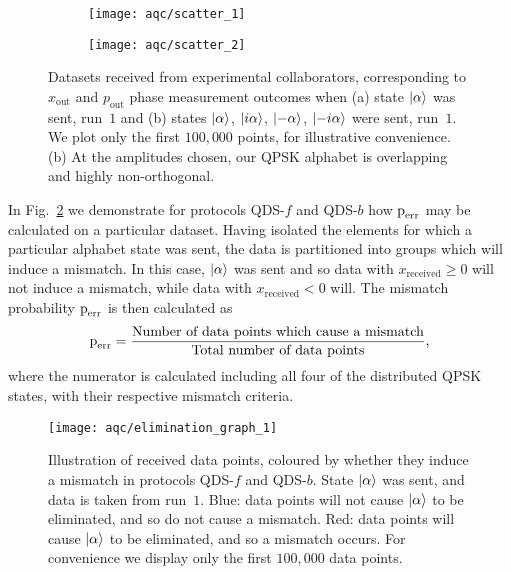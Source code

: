 \begin{figure}[htp]
\captionsetup{width=0.8\linewidth}
\centering
	\begin{subfigure}{0.49\linewidth}
	\centering
	\texttt{[image: aqc/scatter\_1]}
	\caption{}
	\end{subfigure}
	\begin{subfigure}{0.49\linewidth}
	\centering
	\texttt{[image: aqc/scatter\_2]}
	\end{subfigure}
\caption{\label{fig:aqc_scatter} Datasets received from experimental collaborators, corresponding to $x_{\text{out}}$ and $p_{\text{out}}$ phase measurement outcomes when (a) state $\ket{\alpha}$ was sent, run~$1$ and (b) states $\ket{\alpha}$, $\ket{i \alpha}$, $\ket{- \alpha}$, $\ket{- i \alpha}$ were sent, run~$1$. We plot only the first $100,000$ points, for illustrative convenience. (b) At the amplitudes chosen, our QPSK alphabet is overlapping and highly non-orthogonal.}
\end{figure}

In Fig.~\ref{fig:aqc_elimsig} we demonstrate for protocols QDS-$f$ and QDS-$b$ how $\text{p}_{\text{err}}$ may be calculated on a particular dataset. Having isolated the elements for which a particular alphabet state was sent, the data is partitioned into groups which will induce a mismatch. In this case, $\ket{\alpha}$ was sent and so data with $x_{\text{received}} \ge 0$ will not induce a mismatch, while data with $x_{\text{received}}<0$ will. The mismatch probability $\text{p}_{\text{err}}$ is then calculated as
\begin{equation}\label{eqn:aqc_data_perr}
\text{p}_{\text{err}} = \frac{\text{Number of data points which cause a mismatch}}{\text{Total number of data points}},
\end{equation}
where the numerator is calculated including all four of the distributed QPSK states, with their respective mismatch criteria.

\begin{figure}[htp]
\captionsetup{width=0.8\linewidth}
\centering
\texttt{[image: aqc/elimination\_graph\_1]}
\caption{\label{fig:aqc_elimsig} Illustration of received data points, coloured by whether they induce a mismatch in protocols QDS-$f$ and QDS-$b$. State $\ket{\alpha}$ was sent, and data is taken from run~$1$. Blue: data points will not cause $\ket{\alpha}$ to be eliminated, and so do not cause a mismatch. Red: data points will cause $\ket{\alpha}$ to be eliminated, and so a mismatch occurs. For convenience we display only the first $100,000$ data points.}
\end{figure}

